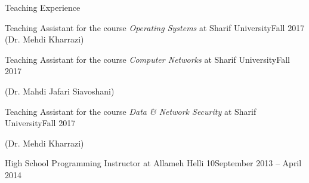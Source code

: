 \begin{rSection}{Teaching Experience}

    \begin{rSubsection}{Teaching Assistant for the course \textit{Operating Systems} at Sharif University}{Fall 2017}{}{}
        \vspace{-.1cm}
        (Dr. Mehdi Kharrazi)
    \end{rSubsection}

    \vspace{-.3cm}

    \begin{rSubsection}{Teaching Assistant for the course \textit{Computer Networks} at Sharif University}{Fall 2017}{}{}
    \item[]
        \vspace{-.1cm}
        (Dr. Mahdi Jafari Siavoshani)	
    \end{rSubsection}

    \vspace{-.3cm}

    \begin{rSubsection}{Teaching Assistant for the course \textit{Data \& Network Security} at Sharif University}{Fall 2017}{}{}
    \item[]
        \vspace{-.1cm}
        (Dr. Mehdi Kharrazi)

    \end{rSubsection}

    \vspace{-.3cm}

    \begin{rSubsection}{High School Programming Instructor at Allameh Helli 10}{September 2013 -- April 2014}{}{}
    \item[]
        \vspace{-.1cm}	
    \end{rSubsection}

\end{rSection}

